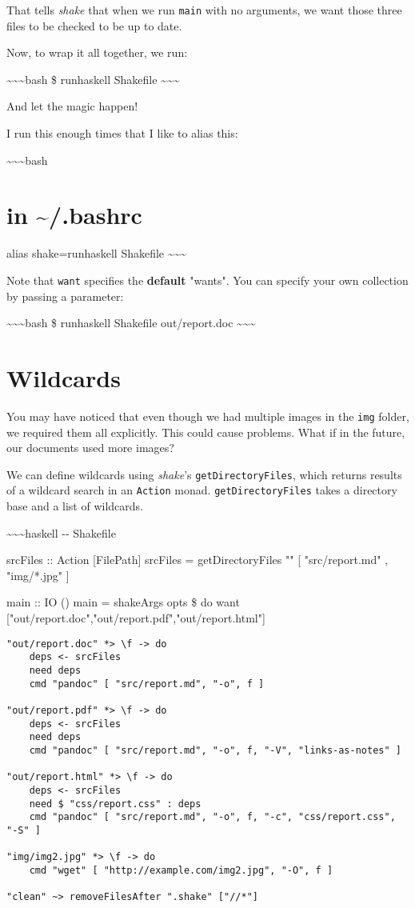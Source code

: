 \documentclass[]{article}
\begin{document}
That tells \emph{shake} that when we run \texttt{main} with no arguments, we
want those three files to be checked to be up to date.

Now, to wrap it all together, we run:

\textasciitilde{}\textasciitilde{}\textasciitilde{}bash \$ runhaskell Shakefile
\textasciitilde{}\textasciitilde{}\textasciitilde{}

And let the magic happen!

I run this enough times that I like to alias this:

\textasciitilde{}\textasciitilde{}\textasciitilde{}bash

\section{in \textasciitilde{}/.bashrc}

alias shake=runhaskell Shakefile
\textasciitilde{}\textasciitilde{}\textasciitilde{}

Note that \texttt{want} specifies the \textbf{default} "wants". You can specify
your own collection by passing a parameter:

\textasciitilde{}\textasciitilde{}\textasciitilde{}bash \$ runhaskell Shakefile
out/report.doc \textasciitilde{}\textasciitilde{}\textasciitilde{}

\section{Wildcards}

You may have noticed that even though we had multiple images in the \texttt{img}
folder, we required them all explicitly. This could cause problems. What if in
the future, our documents used more images?

We can define wildcards using \emph{shake}'s \texttt{getDirectoryFiles}, which
returns results of a wildcard search in an \texttt{Action} monad.
\texttt{getDirectoryFiles} takes a directory base and a list of wildcards.

\textasciitilde{}\textasciitilde{}\textasciitilde{}haskell -\/- Shakefile

srcFiles :: Action {[}FilePath{]} srcFiles = getDirectoryFiles "" {[}
"src/report.md" , "img/*.jpg" {]}

main :: IO () main = shakeArgs opts \$ do want
{[}"out/report.doc","out/report.pdf","out/report.html"{]}

\begin{verbatim}
"out/report.doc" *> \f -> do
    deps <- srcFiles
    need deps
    cmd "pandoc" [ "src/report.md", "-o", f ]

"out/report.pdf" *> \f -> do
    deps <- srcFiles
    need deps
    cmd "pandoc" [ "src/report.md", "-o", f, "-V", "links-as-notes" ]

"out/report.html" *> \f -> do
    deps <- srcFiles
    need $ "css/report.css" : deps
    cmd "pandoc" [ "src/report.md", "-o", f, "-c", "css/report.css", "-S" ]

"img/img2.jpg" *> \f -> do
    cmd "wget" [ "http://example.com/img2.jpg", "-O", f ]

"clean" ~> removeFilesAfter ".shake" ["//*"]
\end{verbatim}
\end{document}
